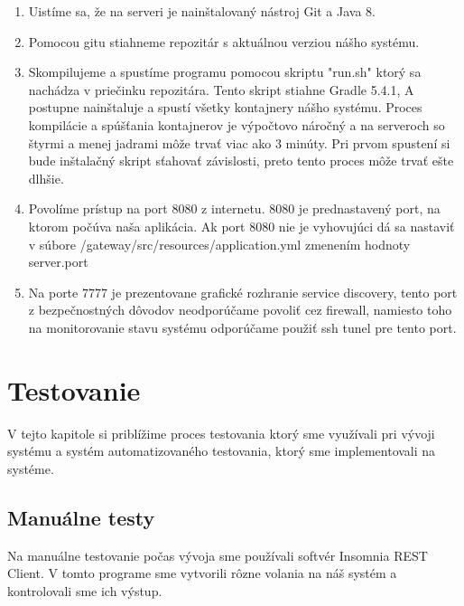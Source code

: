 \begin{enumerate}
    \item Uistíme sa, že na serveri je nainštalovaný nástroj Git a Java 8.
	\item Pomocou gitu stiahneme repozitár \cite{dp_repo} s aktuálnou verziou nášho systému.
    \item Skompilujeme a spustíme programu pomocou skriptu "run.sh" ktorý sa nachádza v priečinku repozitára. Tento skript stiahne Gradle 5.4.1, A postupne nainštaluje a spustí všetky kontajnery nášho systému.
	Proces kompilácie a spúšťania kontajnerov je výpočtovo náročný a na serveroch so štyrmi a menej jadrami môže trvať viac ako 3 minúty. Pri prvom spustení si bude inštalačný skript sťahovať závislosti, preto tento proces môže trvať ešte dlhšie.
    \item Povolíme prístup na port 8080 z internetu. 8080 je prednastavený port, na ktorom počúva naša aplikácia. Ak port 8080 nie je vyhovujúci dá sa nastaviť v súbore /gateway/src/resources/application.yml zmenením hodnoty server.port
    \item Na porte 7777 je prezentovane grafické rozhranie service discovery, tento port z bezpečnostných dôvodov neodporúčame povoliť cez firewall, namiesto toho na monitorovanie stavu systému odporúčame použiť ssh tunel pre tento port.
\end{enumerate}

\section{Testovanie}
V tejto kapitole si priblížime proces testovania ktorý sme využívali pri vývoji systému a systém automatizovaného testovania, ktorý sme implementovali na systéme.

\subsection{Manuálne testy}

Na manuálne testovanie počas vývoja sme používali softvér Insomnia REST Client\cite{insomnia}. V tomto programe sme vytvorili rôzne volania na náš systém a kontrolovali sme ich výstup.

